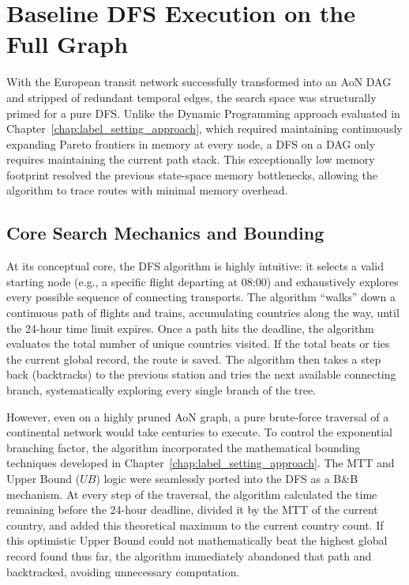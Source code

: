 \section{Baseline DFS Execution on the Full Graph}
\label{sec:baseline_dfs}

With the European transit network successfully transformed into an AoN DAG and stripped of redundant temporal edges, the search space was structurally primed for a pure DFS. Unlike the Dynamic Programming approach evaluated in Chapter~\ref{chap:label_setting_approach}, which required maintaining continuously expanding Pareto frontiers in memory at every node, a DFS on a DAG only requires maintaining the current path stack. This exceptionally low memory footprint resolved the previous state-space memory bottlenecks, allowing the algorithm to trace routes with minimal memory overhead.

\subsection{Core Search Mechanics and Bounding}
\label{subsec:core_search_bounding}

At its conceptual core, the DFS algorithm is highly intuitive: it selects a valid starting node (e.g., a specific flight departing at 08:00) and exhaustively explores every possible sequence of connecting transports. The algorithm ``walks'' down a continuous path of flights and trains, accumulating countries along the way, until the 24-hour time limit expires. Once a path hits the deadline, the algorithm evaluates the total number of unique countries visited. If the total beats or ties the current global record, the route is saved. The algorithm then takes a step back (backtracks) to the previous station and tries the next available connecting branch, systematically exploring every single branch of the tree.

\medskip

However, even on a highly pruned AoN graph, a pure brute-force traversal of a continental network would take centuries to execute. To control the exponential branching factor, the algorithm incorporated the mathematical bounding techniques developed in Chapter~\ref{chap:label_setting_approach}. The MTT and Upper Bound ($UB$) logic were seamlessly ported into the DFS as a B\&B mechanism. At every step of the traversal, the algorithm calculated the time remaining before the 24-hour deadline, divided it by the MTT of the current country, and added this theoretical maximum to the current country count. If this optimistic Upper Bound could not mathematically beat the highest global record found thus far, the algorithm immediately abandoned that path and backtracked, avoiding unnecessary computation.


